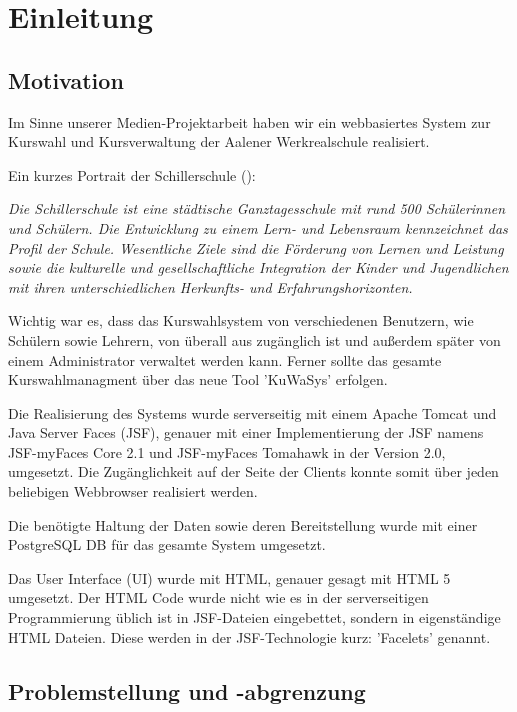 \section{Einleitung}

\subsection{Motivation}

Im Sinne unserer Medien-Projektarbeit haben wir ein webbasiertes System zur Kurswahl und Kursverwaltung der Aalener Werkrealschule  realisiert.

Ein kurzes Portrait der Schillerschule (\cite{Sch-Po}):

\begin{center}
\textit{
\grqq Die Schillerschule ist eine städtische Ganztagesschule mit rund 500 Schülerinnen und Schülern. Die Entwicklung zu einem Lern- und Lebensraum kennzeichnet das Profil der Schule. Wesentliche Ziele sind die Förderung von Lernen und Leistung sowie die kulturelle und gesellschaftliche Integration der Kinder und Jugendlichen mit ihren unterschiedlichen Herkunfts- und Erfahrungshorizonten.\glqq}
\end{center}

Wichtig war es, dass das Kurswahlsystem von verschiedenen Benutzern, wie Schülern sowie Lehrern, von überall aus zugänglich ist und außerdem später von einem Administrator verwaltet werden kann. Ferner sollte das gesamte Kurswahlmanagment über das neue Tool 'KuWaSys' erfolgen.

Die Realisierung des Systems wurde serverseitig mit einem \gls{Apache Tomcat} und \gls{Java Server Faces} (JSF), genauer mit einer Implementierung der JSF namens \gls{JSF-myFaces Core} 2.1 und \gls{JSF-myFaces Tomahawk} in der Version 2.0, umgesetzt.
Die Zugänglichkeit auf der Seite der Clients konnte somit über jeden beliebigen Webbrowser realisiert werden.

Die benötigte Haltung der Daten sowie deren Bereitstellung wurde mit einer \gls{PostgreSQL} \ac{DB} für das gesamte System umgesetzt.

Das \gls{User Interface} (UI) wurde mit \gls{HTML}, genauer gesagt mit HTML 5 umgesetzt. Der HTML Code wurde nicht wie es in der serverseitigen Programmierung üblich ist in \ac{JSF}-Dateien eingebettet, sondern in eigenständige HTML Dateien.
Diese werden in der \ac{JSF}-Technologie kurz: 'Facelets' genannt.

\subsection{Problemstellung und -abgrenzung}\label{subsec:Problemstellung und -abgrenzung}

